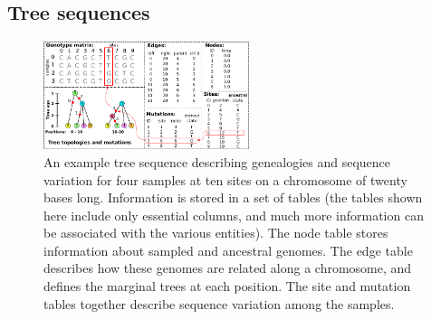 \documentclass{article}
\newcommand{\msprime}[0]{\texttt{msprime}}
\newcommand{\tskit}[0]{\texttt{tskit}}
\begin{document}

\subsection*{Tree sequences}
\label{sec-ts}

\begin{figure}
\begin{center}
\includegraphics[width=6cm]{illustrations/example_tree_sequence}
\end{center}
\caption{\label{fig-ts-example} An example tree sequence describing
genealogies and sequence variation for four samples at ten sites
on a chromosome of twenty bases long.
Information is stored in a set of tables
(the tables shown here include only essential columns, and
much more information can be associated with the various entities).
The node table
stores information about sampled and ancestral genomes. The
edge table describes how these genomes are related along a
chromosome, and defines the marginal trees at each position.
The site and mutation tables together describe sequence variation
among the samples.
}
\end{figure}
\end{document}
